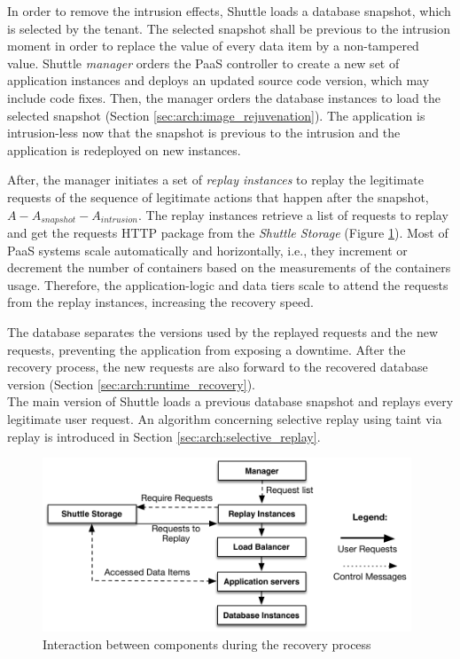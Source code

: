 In order to remove the intrusion effects, Shuttle loads a database snapshot, which is selected by the tenant. The selected snapshot shall be previous to the intrusion moment in order to replace the value of every data item by a non-tampered value. Shuttle \textit{manager} orders the \ac{PaaS} controller to create a new set of application instances and deploys an updated source code version, which may include code fixes. Then, the manager orders the database instances to load the selected snapshot (Section \ref{sec:arch:image_rejuvenation}). The application is intrusion-less now that the snapshot is previous to the intrusion and the application is redeployed on new instances. 

After, the manager initiates a set of \textit{replay instances} to replay the legitimate requests of the sequence of legitimate actions that happen after the snapshot, $A-A_{snapshot}-A_{intrusion}$. The replay instances retrieve a list of requests to replay and get the requests \ac{HTTP} package from the \emph{Shuttle Storage} (Figure \ref{fig:replay_execution}). Most of \ac{PaaS} systems scale automatically and horizontally, i.e., they increment or decrement the number of containers based on the measurements of the containers usage. Therefore, the application-logic and data tiers scale to attend the requests from the replay instances, increasing the recovery speed.

The database separates the versions used by the replayed requests and the new requests, preventing the application from exposing a downtime. After the recovery process, the new requests are also forward to the recovered database version (Section \ref{sec:arch:runtime_recovery}).\\
The main version of Shuttle loads a previous database snapshot and replays every legitimate user request. An algorithm concerning selective replay using taint via replay is introduced in Section \ref{sec:arch:selective_replay}. 




\begin{figure}
\centering
\includegraphics[width=110mm]{images/replayExecution}
\caption{Interaction between components during the recovery process}
\label{fig:replay_execution}
\end{figure}









